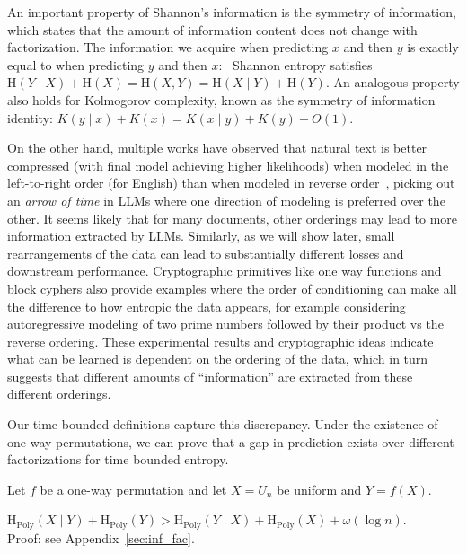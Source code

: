 \documentclass[twoside]{article}
\newcommand{\rH}{\mathrm{H}}
\begin{document}
An important property of Shannon's information is the symmetry of information, which states that the amount of information content does not change with factorization.
The information we acquire when predicting $x$ and then $y$ is exactly equal to when predicting $y$ and then $x$:~ Shannon entropy satisfies $\rH(Y \mid X) + \rH(X) = \rH(X,Y) = \rH(X\mid Y) + \rH(Y)$. An analogous property also holds for Kolmogorov complexity, known as the symmetry of information identity: $K(y\mid x) + K(x) = K(x \mid y) + K(y) + O(1)$.

%
On the other hand, multiple works have observed that natural text is better compressed (with final model achieving higher likelihoods) when modeled in the left-to-right order (for English) than when modeled in reverse order~\citep{papadopoulos2024arrows, bengio2019meta}, picking out an \textit{arrow of time} in LLMs where one direction of modeling is preferred over the other. It seems likely that for many documents, other orderings may lead to more information extracted by LLMs. Similarly, as we will show later, small rearrangements of the data can lead to substantially different losses and downstream performance. Cryptographic primitives like one way functions and block cyphers also provide examples where the order of conditioning can make all the difference to how entropic the data appears, for example considering autoregressive modeling of two prime numbers followed by their product vs the reverse ordering. These experimental results and cryptographic ideas indicate what can be learned is dependent on the ordering of the data, which in turn suggests that different amounts of ``information'' are extracted from these different orderings. 

%
%
%

%
%
%
%
%
%


%
%
%
%
%
%
%
%
%
%
%
%
%
%
%
%
%
%
%
%

%
%
%

%

%
%
%
%
%
Our time-bounded definitions capture this discrepancy. Under the existence of one way permutations, we can prove that a gap in prediction exists over different factorizations for time bounded entropy.
\begin{theorem}\label{thm:asymmtry}
    Let $f$ be a one-way permutation and let $X = U_n$ be uniform and $Y=f(X)$. %
    
    $ \rH_{\mathrm{Poly}}(X \mid Y) + \rH_{\mathrm{Poly}}(Y) > \rH_{\mathrm{Poly}}(Y \mid X) + \rH_{\mathrm{Poly}}(X)+\omega(\log n). $ \\
    Proof: see Appendix~\ref{sec:inf_fac}.
\end{theorem}
%
%
%
%
%
%
%
%
\end{document}
